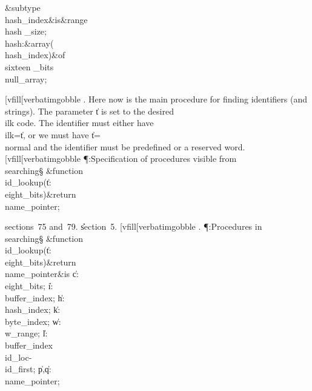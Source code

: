 \&{subtype}\8\\{hash\_index}\8\&{is}\8\8\&{range}\?\to\?\\{hash%
\_size};\6
\\{hash}\?:\1\&{array}\8\1(\?\\{hash\_index}\?\2)\2\8\&{of}\?\8\\{sixteen%
\_bits}\?\K\?\\{null\_array};\par
\fi
[vfill[verbatimgobble
. Here now is the main procedure for finding identifiers (and strings).
The parameter \|t is set to the desired \\{ilk} code.
The identifier must either have \\{ilk}\?=\?\|t, or we must have \|t\?=\?%
\\{normal} and the
identifier must be predefined or a reserved word.
[vfill[verbatimgobble
\Y\P\?\4:Specification of procedures visible from \\{searching}\X\S\?\6
\&{function}\8\1\\{id\_lookup}\?(\1\?\|t\?:\?\\{eight\_bits}\?\2)\&{return}\?\8%
\\{name\_pointer}\2;\par
\A sections~75 and~79.
\U section~5.\fi
[vfill[verbatimgobble
. \P\?:Procedures in \\{searching}\X\S\?\6
\&{function}\8\1\\{id\_lookup}\?(\1\?\|t\?:\?\\{eight\_bits}\?\2)\&{return}\?\8%
\\{name\_pointer}\2\8\&{is}\8\1\6
\|c\?:\?\\{eight\_bits};\6
\|i\?:\?\\{buffer\_index};\6
\|h\?:\?\\{hash\_index};\6
\|k\?:\?\\{byte\_index};\6
\|w\?:\?\\{w\_range};\6
\|l\?:\?\\{buffer\_index}\?\K\?\\{id\_loc}\?-\?\\{id\_first};\6
\|p\?,\?\|q\?:\?\\{name\_pointer};\6
